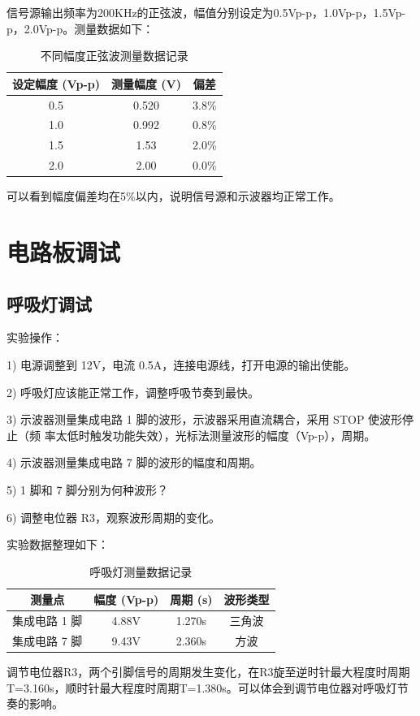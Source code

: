 \documentclass[12pt,a4paper]{article}
\begin{document}
信号源输出频率为200KHz的正弦波，幅值分别设定为0.5Vp-p，1.0Vp-p，1.5Vp-p，2.0Vp-p。测量数据如下：
\begin{table}[H]
    \centering
    \begin{tabular}{|c|c|c|}
        \hline
        设定幅度 (Vp-p)  & 测量幅度 (V)  & 偏差 \\ \hline
        0.5             & 0.520     & 3.8\%              \\ \hline
        1.0             & 0.992   & 0.8\%              \\ \hline
        1.5             & 1.53   & 2.0\%              \\ \hline
        2.0             & 2.00   & 0.0\%              \\ \hline
    \end{tabular}
    \caption{不同幅度正弦波测量数据记录}
    \label{tab:amplitude_variation_measurements}
\end{table}
可以看到幅度偏差均在5\%以内，说明信号源和示波器均正常工作。

\section{电路板调试}
\subsection{呼吸灯调试}
实验操作：

1) 电源调整到 12V，电流 0.5A，连接电源线，打开电源的输出使能。

2) 呼吸灯应该能正常工作，调整呼吸节奏到最快。

3) 示波器测量集成电路 1 脚的波形，示波器采用直流耦合，采用 STOP 使波形停止（频
率太低时触发功能失效），光标法测量波形的幅度（Vp-p），周期。

4) 示波器测量集成电路 7 脚的波形的幅度和周期。

5) 1 脚和 7 脚分别为何种波形？

6) 调整电位器 R3，观察波形周期的变化。

实验数据整理如下：
\begin{table}[H]
    \centering
    \begin{tabular}{|c|c|c|c|}
        \hline
        测量点 & 幅度 (Vp-p) & 周期 (s) & 波形类型 \\ \hline
        集成电路 1 脚 & 4.88V       & 1.270s & 三角波  \\ \hline
        集成电路 7 脚 & 9.43V       & 2.360s & 方波  \\ \hline
    \end{tabular}
    \caption{呼吸灯测量数据记录}
    \label{tab:breathing_light_measurements}
\end{table}
调节电位器R3，两个引脚信号的周期发生变化，在R3旋至逆时针最大程度时周期T=3.160s，顺时针最大程度时周期T=1.380s。可以体会到调节电位器对呼吸灯节奏的影响。
\end{document}
